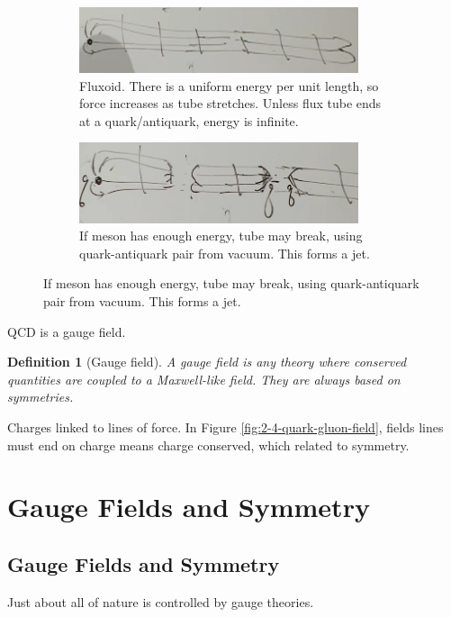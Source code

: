 \documentclass[]{article}
\newtheorem{defn}[thm]{Definition}
\begin{document}
\begin{figure}[H]
\begin{subfigure}{0.45\textwidth}
	\end{subfigure}
	\begin{subfigure}{0.45\textwidth}
		\caption{Fluxoid. There is a uniform energy per unit length, so force increases as tube stretches. Unless flux tube ends at a quark/antiquark, energy is infinite.}
		\includegraphics[width=0.9\textwidth]{2-4-quark-gluon-field-tube-uniform-energy}
	\end{subfigure}
	\begin{subfigure}{0.45\textwidth}
		\caption{If meson has enough energy, tube may break, using quark-antiquark pair from vacuum. This forms a jet.}
		\includegraphics[width=0.9\textwidth]{2-4-split-meson}
	\end{subfigure}
\end{figure}

QCD is a gauge field.

\begin{defn}[Gauge field]
	A gauge field is any theory where conserved quantities are coupled to a Maxwell-like field. They are always based on symmetries.
\end{defn}

Charges linked to lines of force. In Figure \ref{fig:2-4-quark-gluon-field}, fields lines must end on charge means charge conserved, which related to symmetry.

\section{Gauge Fields and Symmetry}

\subsection{Gauge Fields and Symmetry}

Just about all of nature is controlled by gauge theories.
\end{document}
